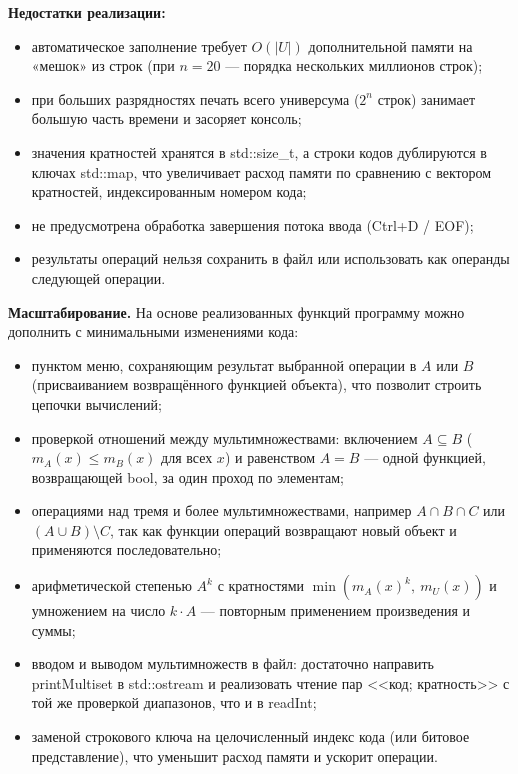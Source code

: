 \documentclass[14pt,a4paper]{extarticle}
\newcommand{\mult}[2]{m_{#1}(#2)}
\newcommand{\card}[1]{\left|#1\right|}
\newcommand{\code}[1]{{\monofont #1}}
\begin{document}
\textbf{Недостатки реализации:}
\begin{itemize}
\item автоматическое заполнение требует $O(\card{U})$ дополнительной памяти на «мешок» из строк (при $n=20$ --- порядка нескольких миллионов строк);
\item при больших разрядностях печать всего универсума ($2^n$ строк) занимает большую часть времени и засоряет консоль;
\item значения кратностей хранятся в \code{std::size\_t}, а строки кодов дублируются в ключах \code{std::map}, что увеличивает расход памяти по сравнению с вектором кратностей, индексированным номером кода;
\item не предусмотрена обработка завершения потока ввода (Ctrl+D / EOF);
\item результаты операций нельзя сохранить в файл или использовать как операнды следующей операции.
\end{itemize}

\textbf{Масштабирование.} На основе реализованных функций программу можно дополнить с минимальными изменениями кода:
\begin{itemize}
\item пунктом меню, сохраняющим результат выбранной операции в $A$ или $B$ (присваиванием возвращённого функцией объекта), что позволит строить цепочки вычислений;
\item проверкой отношений между мультимножествами: включением $A\subseteq B$ ($\mult{A}{x}\le\mult{B}{x}$ для всех $x$) и равенством $A=B$ --- одной функцией, возвращающей \code{bool}, за один проход по элементам;
\item операциями над тремя и более мультимножествами, например $A\cap B\cap C$ или $(A\cup B)\setminus C$, так как функции операций возвращают новый объект и применяются последовательно;
\item арифметической степенью $A^k$ с кратностями $\min(\mult{A}{x}^k,\ \mult{U}{x})$ и умножением на число $k\cdot A$ --- повторным применением произведения и суммы;
\item вводом и выводом мультимножеств в файл: достаточно направить \code{printMultiset} в \code{std::ostream} и реализовать чтение пар <<код; кратность>> с той же проверкой диапазонов, что и в \code{readInt};
\item заменой строкового ключа на целочисленный индекс кода (или битовое представление), что уменьшит расход памяти и ускорит операции.
\end{itemize}
\end{document}
